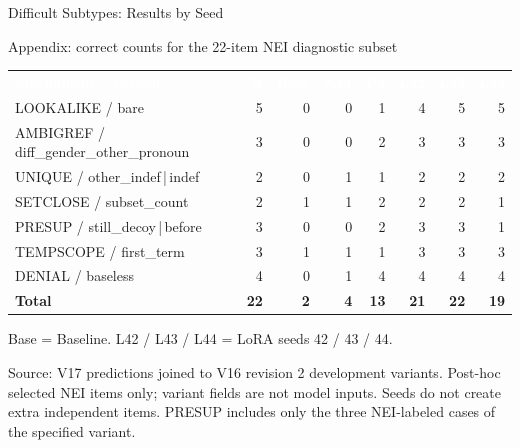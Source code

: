 \documentclass[aspectratio=169,10pt]{beamer}
\newcommand{\hc}[1]{\textcolor{white}{\textbf{#1}}}
\newcommand{\subtitleline}[1]{{\color{Blue}\fontsize{8}{10}\selectfont #1\par}\vspace{.16cm}}
\newcommand{\source}[1]{\vfill{\color{Muted}\fontsize{5.8}{7.2}\selectfont #1\par}}
\begin{document}
\begin{frame}[t]{Difficult Subtypes: Results by Seed}
\subtitleline{Appendix: correct counts for the 22-item NEI diagnostic subset}
{\fontsize{7.5}{9.4}\selectfont
\setlength{\tabcolsep}{3.5pt}
\begin{tabularx}{\textwidth}{Yrrrrrrr}
\hc{Mechanism / variant}&\hc{N}&\hc{Base}&\hc{NLI}&\hc{PJ}&\hc{L42}&\hc{L43}&\hc{L44}\\
LOOKALIKE / bare&5&0&0&1&4&5&5\\
AMBIGREF / diff\_gender\_other\_pronoun&3&0&0&2&3&3&3\\
UNIQUE / other\_indef\,|\,indef&2&0&1&1&2&2&2\\
SETCLOSE / subset\_count&2&1&1&2&2&2&1\\
PRESUP / still\_decoy\,|\,before&3&0&0&2&3&3&1\\
TEMPSCOPE / first\_term&3&1&1&1&3&3&3\\
DENIAL / baseless&4&0&1&4&4&4&4\\
\midrule\textbf{Total}&\textbf{22}&\textbf{2}&\textbf{4}&\textbf{13}&\textbf{21}&\textbf{22}&\textbf{19}\\
\end{tabularx}}
\vspace{.25cm}
\small Base = Baseline. L42 / L43 / L44 = LoRA seeds 42 / 43 / 44.
\source{Source: V17 predictions joined to V16 revision 2 development variants. Post-hoc selected NEI items only; variant fields are not model inputs. Seeds do not create extra independent items. PRESUP includes only the three NEI-labeled cases of the specified variant.}
\end{frame}
\end{document}
